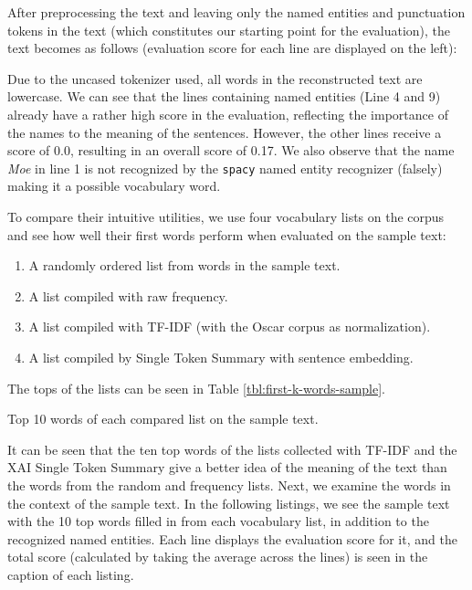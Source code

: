 

After preprocessing the text and leaving only the named entities and punctuation tokens in the text (which constitutes our starting point for the evaluation), the text becomes as follows (evaluation score for each line are displayed on the left):



Due to the uncased tokenizer used, all words in the reconstructed text are lowercase.
We can see that the lines containing named entities (Line 4 and 9) already have a rather high score in the evaluation, reflecting the importance of the names to the meaning of the sentences.
However, the other lines receive a score of 0.0, resulting in an overall score of 0.17.
We also observe that the name \textit{Moe} in line 1 is not recognized by the \texttt{spacy} named entity recognizer (falsely) making it a possible vocabulary word.

To compare their intuitive utilities, we use four vocabulary lists on the corpus and see how well their first words perform when evaluated on the sample text:
\begin{enumerate}
	\item A randomly ordered list from words in the sample text.
	\item A list compiled with raw frequency.
	\item A list compiled with TF-IDF (with the Oscar corpus as normalization).
	\item A list compiled by Single Token Summary with sentence embedding.
\end{enumerate}

The tops of the lists can be seen in Table \ref{tbl:first-k-words-sample}.

\begin{table}[H]
	\centering
	
	\caption{Top 10 words of each compared list on the sample text.}
	\label{tbl:first-k-words-sample}
\end{table}

It can be seen that the ten top words of the lists collected with TF-IDF and the XAI Single Token Summary give a better idea of the meaning of the text than the words from the random and frequency lists.
Next, we examine the words in the context of the sample text.
In the following listings, we see the sample text with the 10 top words filled in from each vocabulary list, in addition to the recognized named entities.
Each line displays the evaluation score for it, and the total score (calculated by taking the average across the lines) is seen in the caption of each listing.


